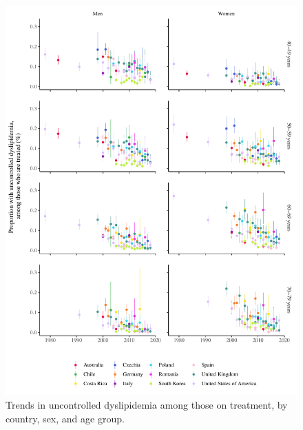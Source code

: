 \documentclass[12pt]{article}
\begin{document}
\begin{figure}[hp]
    \centering
    \includegraphics[width=\textwidth]{../3_figures/fig5_uncontrolled.pdf}
    \caption{Trends in uncontrolled dyslipidemia among those on treatment, by country, sex, and age group.}
    \label{fig:uncontrolled}
\end{figure}


\clearpage
\printbibliography
\end{document}
